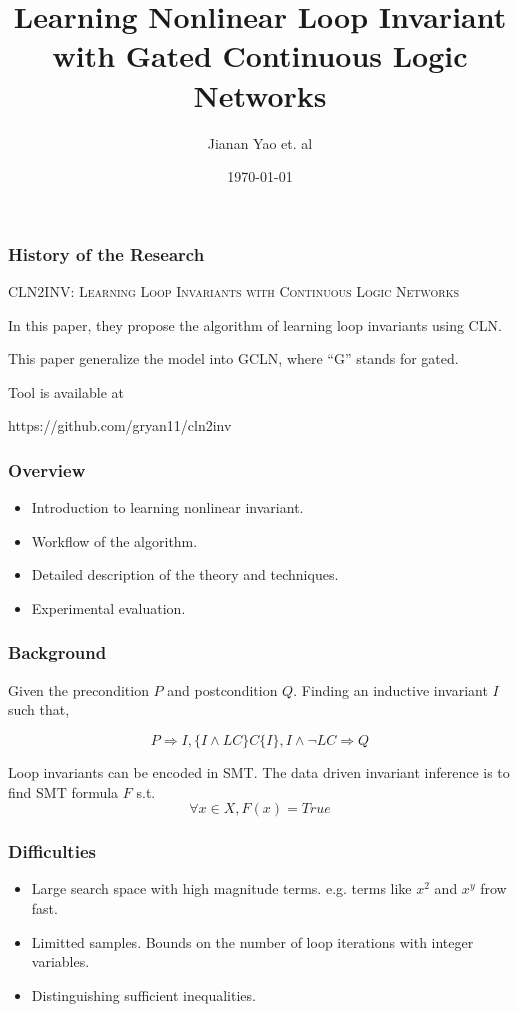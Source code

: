 \documentclass[11pt]{beamer}
\title{Learning Nonlinear Loop Invariant with Gated Continuous Logic Networks}
\date{\today}
\author{Jianan Yao et. al}
\begin{document}
\maketitle

\begin{frame}\frametitle{History of the Research}

\begin{center}
\textsc{CLN2INV: Learning Loop Invariants with Continuous Logic Networks}
\end{center}

In this paper, they propose the algorithm of learning loop invariants using CLN.

This paper generalize the model into GCLN, where ``G'' stands for gated.


Tool is available at

https://github.com/gryan11/cln2inv
\end{frame}
\begin{frame}\frametitle{Overview}
\begin{itemize}
\item Introduction to learning nonlinear invariant.
\item Workflow of the algorithm.
\item Detailed description of the theory and techniques.
\item Experimental evaluation.
\end{itemize}

\end{frame}

\begin{frame}\frametitle{Background}
\begin{definition}
Given the precondition $P$ and postcondition $Q$. Finding an inductive invariant $I$ such that,

\[P\Longrightarrow I, \{I\wedge LC\}C\{I\}, I\wedge \neg LC \Longrightarrow Q\]

\end{definition}
Loop invariants can be encoded in SMT. The data driven invariant inference is to find SMT formula $F$ s.t.
\[\forall x\in X, F(x) = True\]


\end{frame}
\begin{frame}\frametitle{Difficulties}
\begin{itemize}
\item Large search space with high magnitude terms. e.g. terms like $x^2$ and $x^y$ frow fast.

\item Limitted samples. Bounds on the number of loop iterations with integer variables.

\item Distinguishing sufficient inequalities.

\end{itemize}

\end{frame}
\end{document}
